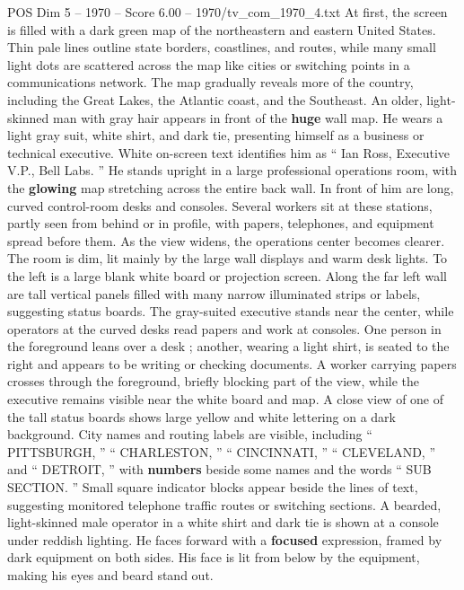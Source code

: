 \begin{textsample}{POS Dim 5 – 1970 – Score 6.00 – 1970/tv\_com\_1970\_4.txt}  \label{ex:f5_pos_086}
At first, the screen is filled with a dark green map of the northeastern and eastern United States.
Thin pale lines outline state borders, coastlines, and routes, while many small light dots are scattered across the map like cities or switching points in a communications network.
The map gradually reveals more of the country, including the Great Lakes, the Atlantic coast, and the Southeast.
An older, light-skinned man with gray hair appears in front of the \textbf{huge} wall map.
He wears a light gray suit, white shirt, and dark tie, presenting himself as a business or technical executive.
White on-screen text identifies him as “ Ian Ross, Executive V.P., Bell Labs. ” He stands upright in a large professional operations room, with the \textbf{glowing} map stretching across the entire back wall.
In front of him are long, curved control-room desks and consoles.
Several workers sit at these stations, partly seen from behind or in profile, with papers, telephones, and equipment spread before them.
As the view widens, the operations center becomes clearer.
The room is dim, lit mainly by the large wall displays and warm desk lights.
To the left is a large blank white board or projection screen.
Along the far left wall are tall vertical panels filled with many narrow illuminated strips or labels, suggesting status boards.
The gray-suited executive stands near the center, while operators at the curved desks read papers and work at consoles.
One person in the foreground leans over a desk ; another, wearing a light shirt, is seated to the right and appears to be writing or checking documents.
A worker carrying papers crosses through the foreground, briefly blocking part of the view, while the executive remains visible near the white board and map.
A close view of one of the tall status boards shows large yellow and white lettering on a dark background.
City names and routing labels are visible, including “ PITTSBURGH, ” “ CHARLESTON, ” “ CINCINNATI, ” “ CLEVELAND, ” and “ DETROIT, ” with \textbf{numbers} beside some names and the words “ SUB SECTION. ” Small square indicator blocks appear beside the lines of text, suggesting monitored telephone traffic routes or switching sections.
A bearded, light-skinned male operator in a white shirt and dark tie is shown at a console under reddish lighting.
He faces forward with a \textbf{focused} expression, framed by dark equipment on both sides.
His face is lit from below by the equipment, making his eyes and beard stand out.

\end{textsample}
